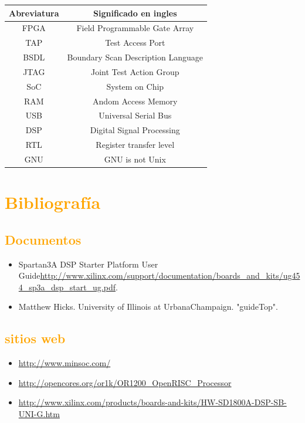 \begin{table}[!h]
\begin{center}
\begin{tabular}{|c|c|}
\hline
\rowcolor[RGB]{255,127,0} Abreviatura & Significado en ingles \\
\hline
FPGA & Field Programmable Gate Array  \\
\hline
TAP & Test Access Port  \\
\hline
\hline
BSDL & Boundary Scan Description Language  \\
\hline
\hline
JTAG & Joint Test Action Group  \\
\hline
\hline
SoC & System on Chip\\
\hline
\hline
RAM & Andom Access Memory \\
\hline
\hline
USB & Universal Serial Bus  \\
\hline
\hline
DSP& Digital Signal Processing \\
\hline
\hline
RTL & Register transfer level \\
\hline
\hline
GNU & GNU is not Unix\\
\hline
\end{tabular}
\end{center}
\end{table}

\newpage

\section{\textcolor{orange}{Bibliografía}}
\subsection{\textcolor{orange}{Documentos}}
\begin{itemize}
\item Spartan\-3A DSP Starter Platform User Guide\url{http://www.xilinx.com/support/documentation/boards_and_kits/ug454_sp3a_dsp_start_ug.pdf}.
\item Matthew Hicks. University of Illinois at Urbana\-Champaign. "guideTop".  
\end{itemize} 
\subsection{\textcolor{orange}{sitios web}}
\begin{itemize}
\item \url{http://www.minsoc.com/}
\item \url{http://opencores.org/or1k/OR1200_OpenRISC_Processor}
\item\url{http://www.xilinx.com/products/boards-and-kits/HW-SD1800A-DSP-SB-UNI-G.htm}

\end{itemize} 


